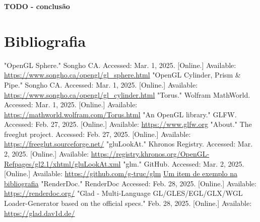 \documentclass[12pt, a4paper]{article}
\begin{document}
\textbf{\color{red} TODO - conclusão}

\begingroup
\section{Bibliografia}
\renewcommand{\section}[2]{}

\begin{thebibliography}{9}
        "OpenGL Sphere."{} Songho CA. Accessed: Mar. 1, 2025. [Online.] Available:
        \url{https://www.songho.ca/opengl/gl_sphere.html}
        "OpenGL Cylinder, Prism \& Pipe."{} Songho CA. Accessed: Mar. 1, 2025. [Online.] Available:
        \url{https://www.songho.ca/opengl/gl_cylinder.html}
        "Torus."{} Wolfram MathWorld. Accessed: Mar. 1, 2025. [Online.] Available:
        \url{https://mathworld.wolfram.com/Torus.html}
        "An OpenGL library."{} GLFW. Accessed: Feb. 27, 2025. [Online.] Available:
        \url{https://www.glfw.org}
        "About."{} The freeglut project. Accessed: Feb. 27, 2025. [Online.] Available:
        \url{https://freeglut.sourceforge.net/}
        "gluLookAt."{} Khronos Registry. Accessed: Mar. 2, 2025. [Online.] Available:
        \url{https://registry.khronos.org/OpenGL-Refpages/gl2.1/xhtml/gluLookAt.xml}
        "glm."{} GitHub. Accessed: Mar. 2, 2025. [Online.] Available:
        \url{https://github.com/g-truc/glm}
        \href{https://youtu.be/dQw4w9WgXcQ}{Um item de exemplo na bibliografia}
        "RenderDoc."{} RenderDoc Accessed: Feb. 28, 2025. [Online.] Available:
        \url{https://renderdoc.org/}
        "Glad - Multi-Language GL/GLES/EGL/GLX/WGL Loader-Generator based on the official specs."{}
        Feb. 28, 2025. [Online.] Available: \url{https://glad.dav1d.de/}
\end{thebibliography}
\endgroup
\end{document}

